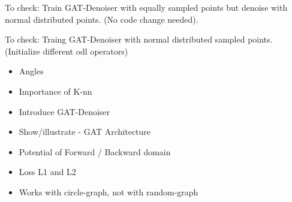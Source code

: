 To check:
Train GAT-Denoiser with equally sampled points but denoise with
normal distributed points.
(No code change needed).

To check:
Traing GAT-Denoiser with normal distributed sampled points.
(Initialize different odl operators)



\begin{itemize}
  \item Angles 
  \item Importance of K-nn 
  \item Introduce GAT-Denoiser
  \item Show/illustrate - GAT Architecture
  \item Potential of Forward / Backward domain
  \item Loss L1 and L2
  \item Works with circle-graph, not with random-graph
\end{itemize}